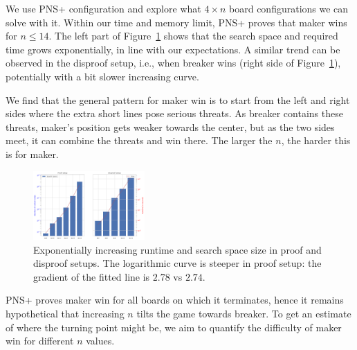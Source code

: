 \documentclass[conference]{IEEEtran}
\theoremstyle{definition}
\begin{document}
\begin{table}[htbp]
\begin{center}
\begin{tabular}{ c | r r | r r }
\hline
\end{tabular}
\label{tab:ablation-1-2}
\end{center}
\end{table}



We use PNS+ configuration and explore what $4\times n$ board configurations we can solve with it. Within our time and memory limit, PNS+ proves that maker wins for $n \leq 14$. The left part of Figure~\ref{fig:proof_results} shows that the search space and required time grows exponentially, in line with our expectations. A similar trend can be observed in the disproof setup, i.e., when breaker wins (right side of Figure~\ref{fig:proof_results}), potentially with a bit slower increasing curve.


We find that the general pattern for maker win is to start from the left and right sides where the extra short lines pose serious threats. As breaker contains these threats, maker's position gets weaker towards the center, but as the two sides meet, it can combine the threats and win there. The larger the $n$, the harder this is for maker.

\begin{figure}
    \centering
    \includegraphics[width=0.38\textwidth]{papers/cog2021/figures/proof_disproof_best.png}
    \caption{Exponentially increasing runtime and search space size in proof and disproof setups. The logarithmic curve is steeper in proof setup: the gradient of the fitted line is $2.78$ vs $2.74$.}
    \label{fig:proof_results}
    \vspace{-10pt}
\end{figure}


PNS+ proves maker win for all boards on which it terminates, hence it remains hypothetical that increasing $n$ tilts the game towards breaker. To get an estimate of where the turning point might be, we aim to quantify the difficulty of maker win for different $n$ values.
\end{document}
